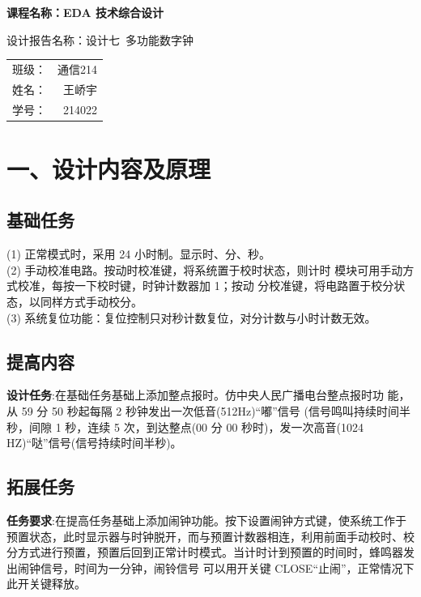\documentclass{article}
\newcommand{\fourhao}{\fontsize{14pt}{\baselineskip}\selectfont} %
\newcommand{\xiaosihao}{\fontsize{12pt}{\baselineskip}\selectfont} %
\begin{document}
\begin{titlepage}
    \centering
    \vspace*{2cm}

    \Huge
    \textbf{课程名称：EDA 技术综合设计}

    \vspace{2cm}

    \LARGE
    设计报告名称：设计七\ 多功能数字钟

    \vspace{4cm}

    \centering
    \Large
    \begin{tabular}{rl}
        班级： & 通信214    \\
        姓名： & \ 王峤宇    \\
        学号： & \ 214022
    \end{tabular}

    \vfill

    \vspace{1cm}
\end{titlepage}

\newpage
\section*{\fourhao 一、设计内容及原理}
\xiaosihao
{}
\subsection*{基础任务}
(1) 正常模式时，采用 24 小时制。显示时、分、秒。 \\
(2) 手动校准电路。按动时校准键，将系统置于校时状态，则计时 模块可用手动方式校准，每按一下校时键，时钟计数器加 1；按动 分校准键，将电路置于校分状态，以同样方式手动校分。\\
(3) 系统复位功能：复位控制只对秒计数复位，对分计数与小时计数无效。
\subsection*{提高内容}
\textbf{设计任务}:在基础任务基础上添加整点报时。仿中央人民广播电台整点报时功 能，从 59 分 50 秒起每隔 2 秒钟发出一次低音(512Hz)“嘟”信号 (信号鸣叫持续时间半秒，间隙 1 秒，连续 5 次，到达整点(00 分 00
秒时)，发一次高音(1024 HZ)“哒”信号(信号持续时间半秒)。
\subsection*{拓展任务}
\textbf{任务要求}:在提高任务基础上添加闹钟功能。按下设置闹钟方式键，使系统工作于预置状态，此时显示器与时钟脱开，而与预置计数器相连，利用前面手动校时、校分方式进行预置，预置后回到正常计时模式。当计时计到预置的时间时，蜂鸣器发出闹钟信号，时间为一分钟，闹铃信号
可以用开关键 CLOSE“止闹”，正常情况下此开关键释放。
\end{document}
